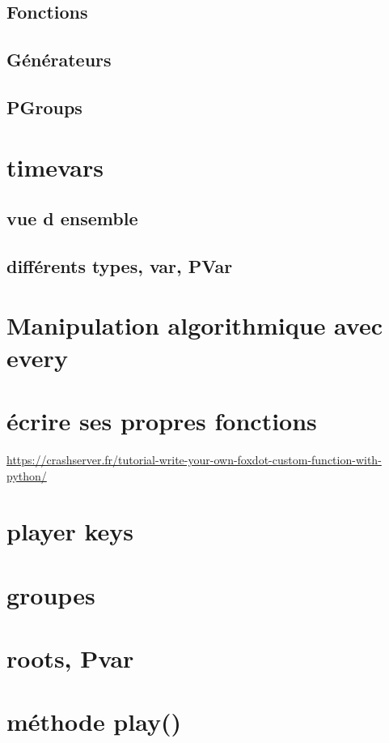 \subsection{Fonctions}
\subsection{Générateurs}
\subsection{PGroups}

\section{timevars}
\subsection{vue d ensemble}
\subsection{différents types, var, PVar}

\section{Manipulation algorithmique avec every}

\section{écrire ses propres fonctions}
\url{https://crashserver.fr/tutorial-write-your-own-foxdot-custom-function-with-python/}

\section{player keys}

\section{groupes}

\section{roots, Pvar}

\section{méthode play()}

